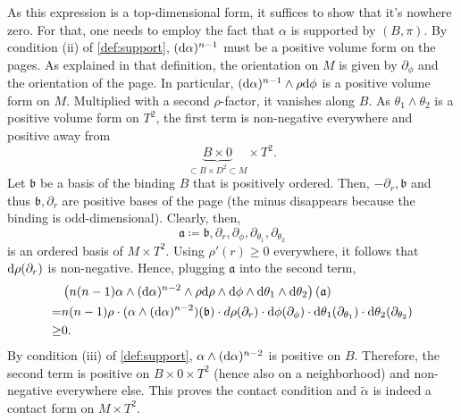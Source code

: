 As this expression is a top-dimensional form, it suffices to show that it's nowhere zero.
For that, one needs to employ the fact that $\alpha$ is supported by $(B, \pi)$.
By condition (ii) of \cref{def:support}, $(\mathrm{d} \alpha)^{n-1}$ must be a positive volume form on the pages. 
As explained in that definition, the orientation on $M$ is given by $\partial_\phi$ and the orientation of the page. 
In particular, $(\mathrm{d} \alpha)^{n-1} \wedge \rho \mathrm{d} \phi$ is a positive volume form on $M$. 
Multiplied with a second $\rho$-factor, it vanishes along $B$. 
As $\theta_1 \wedge \theta_2$ is a positive volume form on $T^2$, the first term is non-negative everywhere and positive away from 
\[
    \underbrace{B \times 0}_{\subset B \times D^2 \subset M} \times T^2.
\]
Let $\mathfrak{b}$ be a basis of the binding $B$ that is positively ordered. 
Then, $- \partial_r, \mathfrak{b}$ and thus $\mathfrak{b}, \partial_r$ are positive bases of the page (the minus disappears because the binding is odd-dimensional). 
Clearly, then, 
\[ 
    \mathfrak{a} \coloneqq \mathfrak{b}, \partial_r, \partial_\phi, \partial_{\theta_1}, \partial_{\theta_2}
\] 
is an ordered basis of $M\times T^2$.
Using $\rho'(r) \geq 0$ everywhere, it follows that $\mathrm{d} \rho(\partial_r)$ is non-negative.
Hence, plugging $\mathfrak{a}$ into the second term,
\begin{align*}
    &\left(n(n-1)\alpha \wedge (\mathrm{d} \alpha)^{n-2}\wedge \rho \mathrm{d}\rho \wedge \mathrm{d} \phi \wedge \mathrm{d} \theta_1 \wedge \mathrm{d} \theta_2\right)(\mathfrak{a})\\
    =& n(n-1) \rho \cdot (\alpha \wedge (\mathrm{d} \alpha)^{n-2})(\mathfrak{b}) \cdot d\rho(\partial_r) \cdot \mathrm{d} \phi(\partial_\phi) \cdot \mathrm{d} \theta_1(\partial_{\theta_1}) \cdot \mathrm{d} \theta_2(\partial_{\theta_2})\\
    \geq& 0.
\end{align*}
By condition (iii) of \cref{def:support}, $\alpha \wedge (\mathrm{d} \alpha)^{n-2}$ is positive on $B$. 
Therefore, the second term is positive on $B \times 0 \times T^2$ (hence also on a neighborhood) and non-negative everywhere else.
This proves the contact condition and $\tilde \alpha$ is indeed a contact form on $M\times T^2$.
